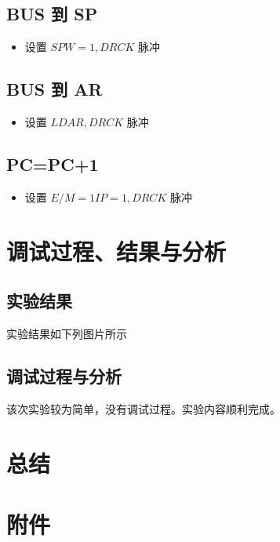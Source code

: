 \documentclass[a4paper,10pt,UTF8]{paper}
\numberwithin{equation}{section}
\numberwithin{figure}{section}
\begin{document}
\subsection{BUS 到 SP}

\begin{itemize}
  \item 设置 $SPW=1, DRCK$ 脉冲
\end{itemize}


\subsection{BUS 到 AR}

\begin{itemize}
  \item 设置 $LDAR, DRCK$ 脉冲
\end{itemize}

\subsection{PC=PC+1}

\begin{itemize}
  \item 设置 $E/M=1 IP=1, DRCK$ 脉冲
\end{itemize}

\section{调试过程、结果与分析}

\subsection{实验结果}

实验结果如下列图片所示



\subsection{调试过程与分析}

该次实验较为简单，没有调试过程。实验内容顺利完成。

\section{总结}

\section{附件}
\end{document}
